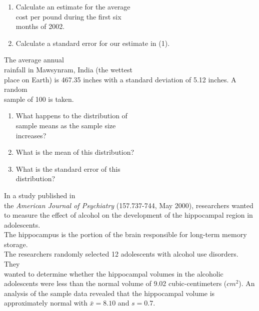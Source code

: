 \documentclass[11pt]{book}\usepackage[]{graphicx}\usepackage[]{color}
\begin{document}
\begin{exercises}
\begin{exercise}
\begin{enumerate}            
  \item Calculate an estimate for the average \\ cost per pound during the first six \\ months of 2002.
  \item Calculate a standard error for our estimate in (1).
\end{enumerate}  

\end{exercise}
\begin{solution}  %

\end{solution}

\begin{exercise}  %

The average annual \\ rainfall in Mawsynram, India (the  wettest \\ place on Earth) is 467.35 inches with a standard deviation of 5.12 inches. A random \\ sample of 100 is taken.

\begin{enumerate}
  \item What happens to the distribution of \\ sample means as the sample size \\ increases?
  \item What is the mean of this distribution? 
  \item What is the standard error of this \\ distribution?
\end{enumerate}

\end{exercise}
\begin{solution}  %

\end{solution}

\begin{exercise} %



In a study published in \\ the \textit{American Journal of Psychiatry} (157.737-744, May 2000), researchers wanted to measure the effect of alcohol on the development of the hippocampal region in adolescents.  \\ The hippocampus is the portion of the brain responsible for long-term memory storage.  \\ The researchers randomly selected 12 adolescents  with alcohol use disorders.  They \\ wanted to determine whether the hippocampal volumes in the alcoholic adolescents were less than the normal volume of 9.02 cubic-centimeters  ($cm^2$).  An analysis of the sample data revealed that the hippocampal volume is approximately normal  with $\bar{x} = 8.10$ and $s = 0.7$.  


\end{exercise}
\end{exercises}
\end{document}
